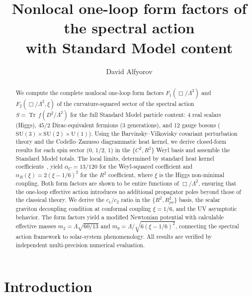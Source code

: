 \documentclass[aps,prd,twocolumn,superscriptaddress,nofootinbib,floatfix]{revtex4-2}
\newcommand{\Tr}{\operatorname{Tr}}
\begin{document}
\title{Nonlocal one-loop form factors of the spectral action\\with Standard Model content}

\author{David Alfyorov}

\begin{abstract}
We compute the complete nonlocal one-loop form factors $F_1(\Box/\Lambda^2)$
and $F_2(\Box/\Lambda^2,\xi)$ of the curvature-squared sector of the spectral
action $S = \Tr\,f(D^2/\Lambda^2)$ for the full Standard Model particle content:
4 real scalars (Higgs), $45/2$ Dirac-equivalent fermions (3 generations), and
12 gauge bosons ($\mathrm{SU}(3)\times\mathrm{SU}(2)\times\mathrm{U}(1)$).
Using the Barvinsky--Vilkovisky covariant perturbation theory and the
Codello--Zanusso diagrammatic heat kernel, we derive closed-form results for
each spin sector (0, 1/2, 1) in the $\{C^2, R^2\}$ Weyl basis and assemble the
Standard Model totals. The local limits, determined by standard heat kernel
coefficients~\cite{Gilkey:1975iq,Vassilevich:2003xt}, yield
$\alpha_C = 13/120$ for the Weyl-squared coefficient and
$\alpha_R(\xi) = 2(\xi-1/6)^2$ for the $R^2$ coefficient, where $\xi$ is the
Higgs non-minimal coupling. Both form factors are shown to be entire functions
of $\Box/\Lambda^2$, ensuring that the one-loop effective action introduces no
additional propagator poles beyond those of the classical theory.
We derive the $c_1/c_2$ ratio in the $\{R^2, R_{\mu\nu}^2\}$ basis, the scalar
graviton decoupling condition at conformal coupling $\xi = 1/6$, and the UV
asymptotic behavior. The form factors yield a modified Newtonian potential with
calculable effective masses $m_2 = \Lambda\sqrt{60/13}$ and
$m_0 = \Lambda/\sqrt{6(\xi-1/6)^2}$, connecting the spectral action framework
to solar-system phenomenology. All results are verified by independent
multi-precision numerical evaluation.
\end{abstract}


\maketitle

\section{Introduction}
\label{sec:intro}
\end{document}
